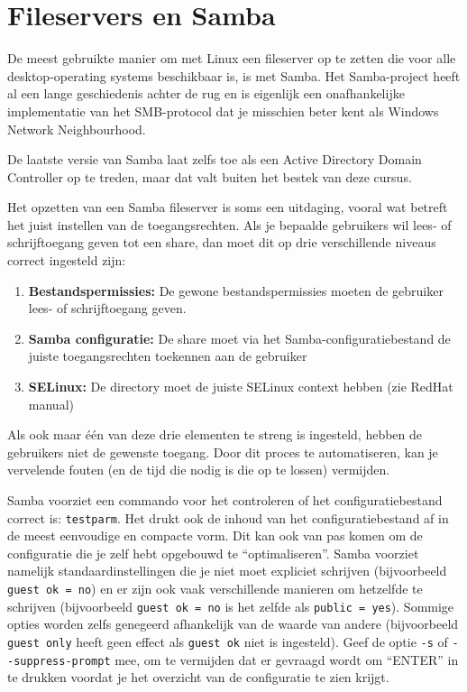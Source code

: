 \section{Fileservers en Samba}
\label{sec:fileservers-en-samba}

De meest gebruikte manier om met Linux een fileserver op te zetten die voor alle desktop-operating systems beschikbaar is, is met Samba. Het Samba-project heeft al een lange geschiedenis achter de rug en is eigenlijk een onafhankelijke implementatie van het SMB-protocol dat je misschien beter kent als Windows Network Neighbourhood.

De laatste versie van Samba laat zelfs toe als een Active Directory Domain Controller op te treden, maar dat valt buiten het bestek van deze cursus.

Het opzetten van een Samba fileserver \autocite{VanVreckem2014,VernooijEtAl2010} is soms een uitdaging, vooral wat betreft het juist instellen van de toegangsrechten. Als je bepaalde gebruikers wil lees- of schrijftoegang geven tot een share, dan moet dit op drie verschillende niveaus correct ingesteld zijn:

\begin{enumerate}
\def\labelenumi{\arabic{enumi}.}
\item \textbf{Bestandspermissies:} De gewone bestandspermissies moeten de gebruiker lees- of schrijftoegang geven.
\item \textbf{Samba configuratie:} De share moet via het Samba-configuratiebestand  de juiste toegangsrechten toekennen aan de gebruiker
\item \textbf{SELinux:} De directory moet de juiste SELinux context hebben (zie RedHat manual)
\end{enumerate}

Als ook maar één van deze drie elementen te streng is ingesteld, hebben de gebruikers niet de gewenste toegang. Door dit proces te automatiseren, kan je vervelende fouten (en de tijd die nodig is die op te lossen) vermijden.

Samba voorziet een commando voor het controleren of het configuratiebestand  correct is: \texttt{testparm}. Het drukt ook de inhoud van het configuratiebestand af in de meest eenvoudige en compacte vorm. Dit kan ook van pas komen om de configuratie die je zelf hebt opgebouwd te ``optimaliseren''. Samba voorziet namelijk standaardinstellingen die je niet moet expliciet schrijven (bijvoorbeeld \texttt{guest\ ok\ =\ no}) en er zijn ook vaak verschillende manieren om hetzelfde te schrijven (bijvoorbeeld \texttt{guest\ ok\ =\ no} is het zelfde als \texttt{public\ =\ yes}). Sommige opties worden zelfs genegeerd afhankelijk van de waarde van andere (bijvoorbeeld \texttt{guest\ only} heeft geen effect als \texttt{guest\ ok} niet is ingesteld). Geef de optie \texttt{-s} of \texttt{-\/-suppress-prompt} mee, om te vermijden dat er gevraagd wordt om ``ENTER'' in te drukken voordat je het overzicht van de configuratie te zien krijgt.

